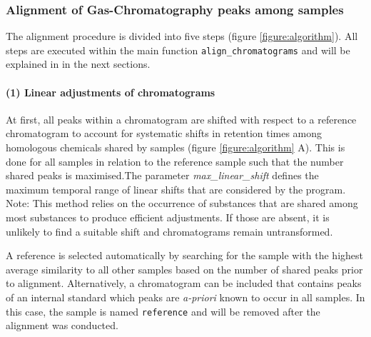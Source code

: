 \subsubsection{Alignment of Gas-Chromatography peaks among
samples}\label{alignment-of-gas-chromatography-peaks-among-samples}

The alignment procedure is divided into five steps (figure
\ref{figure:algorithm}). All steps are executed within the main function
\texttt{align\_chromatograms} and will be explained in in the next
sections.

\paragraph{(1) Linear adjustments of
chromatograms}\label{linear-adjustments-of-chromatograms}

At first, all peaks within a chromatogram are shifted with respect to a
reference chromatogram to account for systematic shifts in retention
times among homologous chemicals shared by samples (figure
\ref{figure:algorithm} A). This is done for all samples in relation to
the reference sample such that the number shared peaks is maximised.The
parameter \emph{max\_linear\_shift} defines the maximum temporal range
of linear shifts that are considered by the program. \newline
Note: This method relies on the occurrence of substances that are shared
among most substances to produce efficient adjustments. If those are
absent, it is unlikely to find a suitable shift and chromatograms remain
untransformed. \par
A reference is selected automatically by searching for the sample with
the highest average similarity to all other samples based on the number
of shared peaks prior to alignment. Alternatively, a chromatogram can be
included that contains peaks of an internal standard which peaks are
\textit{a-priori} known to occur in all samples. In this case, the
sample is named \texttt{reference} and will be removed after the
alignment was conducted.

\newpage

